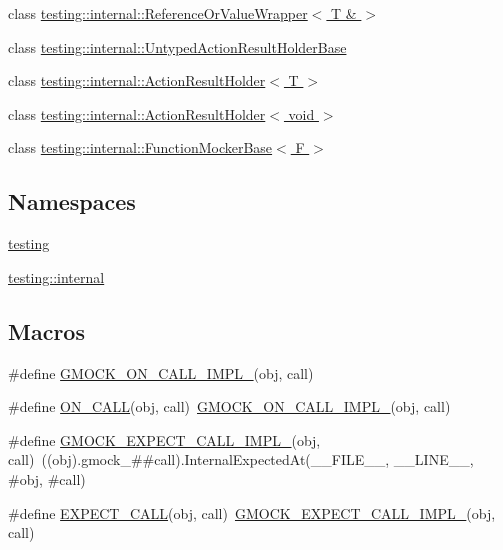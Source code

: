 \begin{DoxyCompactItemize}
\item 
class \hyperlink{classtesting_1_1internal_1_1ReferenceOrValueWrapper_3_01T_01_6_01_4}{testing\+::internal\+::\+Reference\+Or\+Value\+Wrapper$<$ T \& $>$}
\item 
class \hyperlink{classtesting_1_1internal_1_1UntypedActionResultHolderBase}{testing\+::internal\+::\+Untyped\+Action\+Result\+Holder\+Base}
\item 
class \hyperlink{classtesting_1_1internal_1_1ActionResultHolder}{testing\+::internal\+::\+Action\+Result\+Holder$<$ T $>$}
\item 
class \hyperlink{classtesting_1_1internal_1_1ActionResultHolder_3_01void_01_4}{testing\+::internal\+::\+Action\+Result\+Holder$<$ void $>$}
\item 
class \hyperlink{classtesting_1_1internal_1_1FunctionMockerBase}{testing\+::internal\+::\+Function\+Mocker\+Base$<$ F $>$}
\end{DoxyCompactItemize}
\subsection*{Namespaces}
\begin{DoxyCompactItemize}
\item 
 \hyperlink{namespacetesting}{testing}
\item 
 \hyperlink{namespacetesting_1_1internal}{testing\+::internal}
\end{DoxyCompactItemize}
\subsection*{Macros}
\begin{DoxyCompactItemize}
\item 
\#define \hyperlink{gmock-spec-builders_8h_a7c47d936dcf489ac84c046740aea777e}{G\+M\+O\+C\+K\+\_\+\+O\+N\+\_\+\+C\+A\+L\+L\+\_\+\+I\+M\+P\+L\+\_\+}(obj,  call)
\item 
\#define \hyperlink{gmock-spec-builders_8h_a5b12ae6cf84f0a544ca811b380c37334}{O\+N\+\_\+\+C\+A\+LL}(obj,  call)~\hyperlink{gmock-spec-builders_8h_a7c47d936dcf489ac84c046740aea777e}{G\+M\+O\+C\+K\+\_\+\+O\+N\+\_\+\+C\+A\+L\+L\+\_\+\+I\+M\+P\+L\+\_\+}(obj, call)
\item 
\#define \hyperlink{gmock-spec-builders_8h_ae261d723ebfab24d5831030d320f526c}{G\+M\+O\+C\+K\+\_\+\+E\+X\+P\+E\+C\+T\+\_\+\+C\+A\+L\+L\+\_\+\+I\+M\+P\+L\+\_\+}(obj,  call)~((obj).gmock\+\_\+\#\#call).Internal\+Expected\+At(\+\_\+\+\_\+\+F\+I\+L\+E\+\_\+\+\_\+, \+\_\+\+\_\+\+L\+I\+N\+E\+\_\+\+\_\+, \#obj, \#call)
\item 
\#define \hyperlink{gmock-spec-builders_8h_a535a6156de72c1a2e25a127e38ee5232}{E\+X\+P\+E\+C\+T\+\_\+\+C\+A\+LL}(obj,  call)~\hyperlink{gmock-spec-builders_8h_ae261d723ebfab24d5831030d320f526c}{G\+M\+O\+C\+K\+\_\+\+E\+X\+P\+E\+C\+T\+\_\+\+C\+A\+L\+L\+\_\+\+I\+M\+P\+L\+\_\+}(obj, call)
\end{DoxyCompactItemize}
